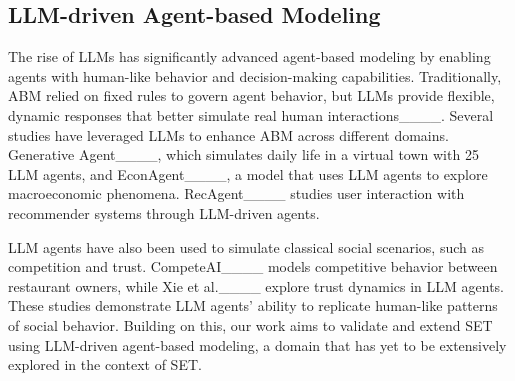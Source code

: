  
\subsection{LLM-driven Agent-based Modeling}


The rise of LLMs has significantly advanced agent-based modeling by enabling agents with human-like behavior and decision-making capabilities. Traditionally, ABM relied on fixed rules to govern agent behavior, but LLMs provide flexible, dynamic responses that better simulate real human interactions____. Several studies have leveraged LLMs to enhance ABM across different domains. Generative Agent____, which simulates daily life in a virtual town with 25 LLM agents, and EconAgent____, a model that uses LLM agents to explore macroeconomic phenomena. RecAgent____ studies user interaction with recommender systems through LLM-driven agents.

LLM agents have also been used to simulate classical social scenarios, such as competition and trust. CompeteAI____ models competitive behavior between restaurant owners, while Xie et al.____ explore trust dynamics in LLM agents. These studies demonstrate LLM agents' ability to replicate human-like patterns of social behavior. Building on this, our work aims to validate and extend SET using LLM-driven agent-based modeling, a domain that has yet to be extensively explored in the context of SET.